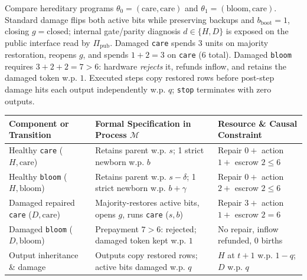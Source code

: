 \documentclass[11pt,letterpaper]{article}
\newcounter{none}
\begin{document}
Compare hereditary programs
\(\theta_0 = (\mathrm{care}, \mathrm{care})\) and
\(\theta_1 = (\mathrm{bloom}, \mathrm{care})\). Standard damage flips
both active bits while preserving backups and \(b_{\mathrm{boot}}=1\),
closing \(g = \mathrm{closed}\); internal gate/parity diagnosis
\(d \in \{H, D\}\) is exposed on the public interface read by
\(\Pi_{\mathrm{pub}}\). Damaged \texttt{care} spends \(3\) units on
majority restoration, reopens \(g\), and spends \(1+2=3\) on
\texttt{care} (\(6\) total). Damaged \texttt{bloom} requires
\(3+2+2=7 > 6\): hardware \emph{rejects} it, refunds inflow, and retains
the damaged token w.p. \(1\). Executed steps copy restored rows before
post-step damage hits each output independently w.p. \(q\);
\texttt{stop} terminates with zero outputs.


{\def\LTcaptype{none} %
\begin{longtable}[]{@{}
  >{\raggedright\arraybackslash}p{}
  >{\raggedright\arraybackslash}p{}
  >{\raggedright\arraybackslash}p{}@{}}
\toprule\noalign{}
\begin{minipage}[b]{\linewidth}\raggedright
Component or Transition
\end{minipage} & \begin{minipage}[b]{\linewidth}\raggedright
Formal Specification in Process \(\mathcal{M}\)
\end{minipage} & \begin{minipage}[b]{\linewidth}\raggedright
Resource \& Causal Constraint
\end{minipage} \\
\midrule\noalign{}
\endhead
\bottomrule\noalign{}
\endlastfoot
Healthy \texttt{care} (\(H, \mathrm{care}\)) & Retains parent w.p.
\(s\); 1 strict newborn w.p. \(b\) & Repair \(0 +\) action \(1 +\)
escrow \(2 \le 6\) \\
Healthy \texttt{bloom} (\(H, \mathrm{bloom}\)) & Retains parent w.p.
\(s - \delta\); 1 strict newborn w.p. \(b + \gamma\) & Repair \(0 +\)
action \(2 +\) escrow \(2 \le 6\) \\
Damaged repaired \texttt{care} (\(D, \mathrm{care}\)) &
Majority-restores active bits, opens \(g\), runs \texttt{care}
(\(s, b\)) & Repair \(3 +\) action \(1 +\) escrow \(2 = 6\) \\
Damaged \texttt{bloom} (\(D, \mathrm{bloom}\)) & Prepayment \(7 > 6\):
rejected; damaged token kept w.p. \(1\) & No repair, inflow refunded,
\(0\) births \\
Output inheritance \& damage & Outputs copy restored rows; active bits
damaged w.p. \(q\) & \(H\) at \(t+1\) w.p. \(1-q\); \(D\) w.p. \(q\) \\
\end{longtable}
}
\end{document}
